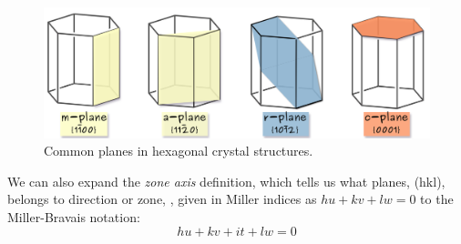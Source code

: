 \begin{figure}[htb]
    \centering
\includegraphics[width=0.85\linewidth]{Figures/hex_planes.png}
\caption{Common planes in hexagonal crystal structures.}
\label{Fig:planes}
\end{figure}
We can also expand the \textit{zone axis} definition, which tells us what planes, \hkl(hkl), belongs to direction or zone, \hkl[uvw], given in Miller indices as $hu + kv + lw = 0$ to the Miller-Bravais notation:
\begin{equation}
hu + kv + it+ lw = 0
\end{equation}

